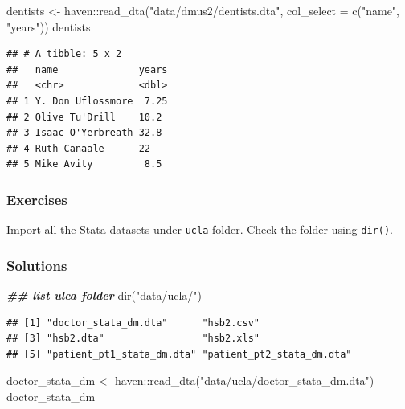 \documentclass[
]{book}
\newenvironment{Shaded}{\begin{snugshade}}{\end{snugshade}}
\newcommand{\AttributeTok}[1]{\textcolor[rgb]{0.77,0.63,0.00}{#1}}
\newcommand{\DocumentationTok}[1]{\textcolor[rgb]{0.56,0.35,0.01}{\textbf{\textit{#1}}}}
\newcommand{\FunctionTok}[1]{\textcolor[rgb]{0.00,0.00,0.00}{#1}}
\newcommand{\NormalTok}[1]{#1}
\newcommand{\OtherTok}[1]{\textcolor[rgb]{0.56,0.35,0.01}{#1}}
\newcommand{\SpecialCharTok}[1]{\textcolor[rgb]{0.00,0.00,0.00}{#1}}
\newcommand{\StringTok}[1]{\textcolor[rgb]{0.31,0.60,0.02}{#1}}
\begin{document}
\begin{Shaded}
\begin{Highlighting}[]
\NormalTok{dentists }\OtherTok{\textless{}{-}}\NormalTok{ haven}\SpecialCharTok{::}\FunctionTok{read\_dta}\NormalTok{(}\StringTok{"data/dmus2/dentists.dta"}\NormalTok{, }
                            \AttributeTok{col\_select =} \FunctionTok{c}\NormalTok{(}\StringTok{"name"}\NormalTok{, }\StringTok{"years"}\NormalTok{))}
\NormalTok{dentists}
\end{Highlighting}
\end{Shaded}

\begin{verbatim}
## # A tibble: 5 x 2
##   name              years
##   <chr>             <dbl>
## 1 Y. Don Uflossmore  7.25
## 2 Olive Tu'Drill    10.2 
## 3 Isaac O'Yerbreath 32.8 
## 4 Ruth Canaale      22   
## 5 Mike Avity         8.5
\end{verbatim}

\hypertarget{exercises-2}{%
\subsubsection{Exercises}\label{exercises-2}}

Import all the Stata datasets under \texttt{ucla} folder. Check the folder using \texttt{dir()}.

\hypertarget{solutions-2}{%
\subsubsection{Solutions}\label{solutions-2}}

\begin{Shaded}
\begin{Highlighting}[]
\DocumentationTok{\#\# list ulca folder}
\FunctionTok{dir}\NormalTok{(}\StringTok{"data/ucla/"}\NormalTok{)}
\end{Highlighting}
\end{Shaded}

\begin{verbatim}
## [1] "doctor_stata_dm.dta"      "hsb2.csv"                
## [3] "hsb2.dta"                 "hsb2.xls"                
## [5] "patient_pt1_stata_dm.dta" "patient_pt2_stata_dm.dta"
\end{verbatim}

\begin{Shaded}
\begin{Highlighting}[]
\NormalTok{doctor\_stata\_dm }\OtherTok{\textless{}{-}}\NormalTok{ haven}\SpecialCharTok{::}\FunctionTok{read\_dta}\NormalTok{(}\StringTok{"data/ucla/doctor\_stata\_dm.dta"}\NormalTok{)}
\NormalTok{doctor\_stata\_dm}
\end{Highlighting}
\end{Shaded}
\end{document}
